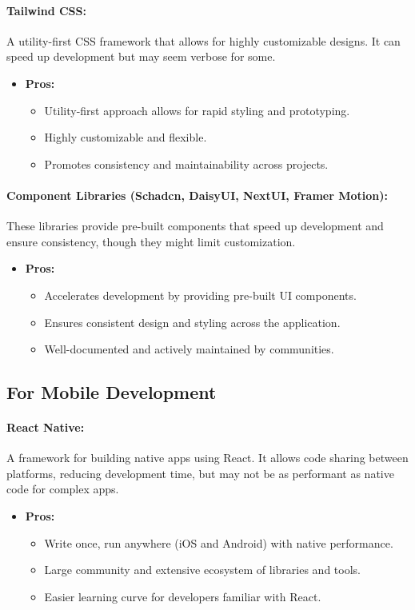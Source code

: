 \documentclass[11pt,a4paper]{article}
\begin{document}
\paragraph{Tailwind CSS:} A utility-first CSS framework that allows for highly customizable designs. It can speed up development but may seem verbose for some.
\begin{itemize}
    \item \textbf{Pros:}
    \begin{itemize}
        \item Utility-first approach allows for rapid styling and prototyping.
        \item Highly customizable and flexible.
        \item Promotes consistency and maintainability across projects.
    \end{itemize}
\end{itemize}

\paragraph{Component Libraries (Schadcn, DaisyUI, NextUI, Framer Motion):} These libraries provide pre-built components that speed up development and ensure consistency, though they might limit customization.
\begin{itemize}
    \item \textbf{Pros:}
    \begin{itemize}
        \item Accelerates development by providing pre-built UI components.
        \item Ensures consistent design and styling across the application.
        \item Well-documented and actively maintained by communities.
    \end{itemize}
\end{itemize}

\subsection*{For Mobile Development}

\paragraph{React Native:} A framework for building native apps using React. It allows code sharing between platforms, reducing development time, but may not be as performant as native code for complex apps.
\begin{itemize}
    \item \textbf{Pros:}
    \begin{itemize}
        \item Write once, run anywhere (iOS and Android) with native performance.
        \item Large community and extensive ecosystem of libraries and tools.
        \item Easier learning curve for developers familiar with React.
    \end{itemize}
\end{itemize}
\end{document}
